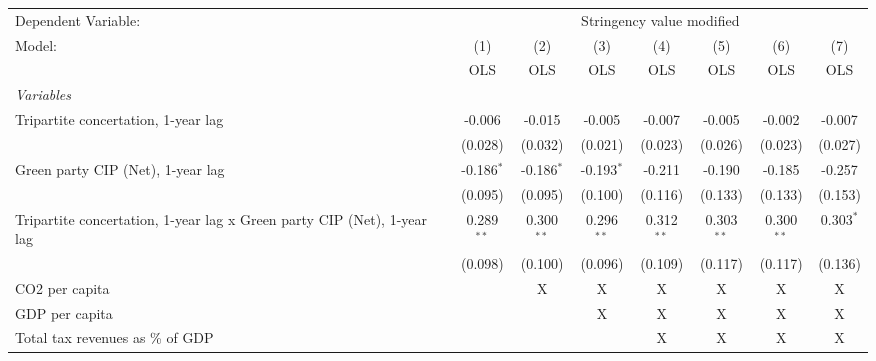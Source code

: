 
\begingroup
\centering
\begin{tabular}{lccccccc}
   \toprule
   Dependent Variable: & \multicolumn{7}{c}{Stringency value modified}\\
   Model:                                                                  & (1)          & (2)          & (3)          & (4)          & (5)          & (6)          & (7)\\  
                                                                           &  OLS         & OLS          & OLS          & OLS          & OLS          & OLS          & OLS\\  
   \midrule
   \emph{Variables}\\
   Tripartite concertation, 1-year lag                                     & -0.006       & -0.015       & -0.005       & -0.007       & -0.005       & -0.002       & -0.007\\   
                                                                           & (0.028)      & (0.032)      & (0.021)      & (0.023)      & (0.026)      & (0.023)      & (0.027)\\   
   Green party CIP (Net), 1-year lag                                       & -0.186$^{*}$ & -0.186$^{*}$ & -0.193$^{*}$ & -0.211       & -0.190       & -0.185       & -0.257\\   
                                                                           & (0.095)      & (0.095)      & (0.100)      & (0.116)      & (0.133)      & (0.133)      & (0.153)\\   
   Tripartite concertation, 1-year lag x Green party CIP (Net), 1-year lag & 0.289$^{**}$ & 0.300$^{**}$ & 0.296$^{**}$ & 0.312$^{**}$ & 0.303$^{**}$ & 0.300$^{**}$ & 0.303$^{*}$\\   
                                                                           & (0.098)      & (0.100)      & (0.096)      & (0.109)      & (0.117)      & (0.117)      & (0.136)\\   
   CO2 per capita                                                          &              & X            & X            & X            & X            & X            & X\\  
   GDP per capita                                                          &              &              & X            & X            & X            & X            & X\\  
   Total tax revenues as \% of GDP                                         &              &              &              & X            & X            & X            & X\\  

\end{tabular}
